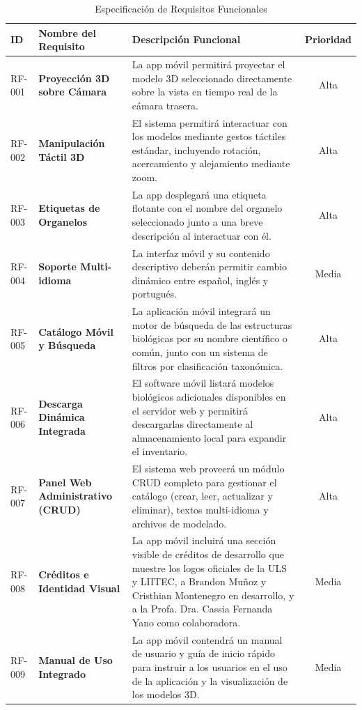\documentclass[11pt,a4paper]{article}
\begin{document}
\begin{table}[H]
    \centering
    \small
    \caption{Especificación de Requisitos Funcionales}
    \vspace{2mm}
    \renewcommand{\arraystretch}{1.3}
    \begin{tabularx}{\textwidth}{l >{\bfseries}l X c}
        \rowcolor{primaryDark}
        \color{white}\textbf{ID} & \color{white}\textbf{Nombre del Requisito} & \color{white}\textbf{Descripción Funcional} & \color{white}\textbf{Prioridad} \\ \toprule
        RF-001 & Proyección 3D sobre Cámara & La app móvil permitirá proyectar el modelo 3D seleccionado directamente sobre la vista en tiempo real de la cámara trasera. & Alta \\
        RF-002 & Manipulación Táctil 3D & El sistema permitirá interactuar con los modelos mediante gestos táctiles estándar, incluyendo rotación, acercamiento y alejamiento mediante zoom. & Alta \\ 
        RF-003 & Etiquetas de Organelos & La app desplegará una etiqueta flotante con el nombre del organelo seleccionado junto a una breve descripción al interactuar con él. & Alta \\
        RF-004 & Soporte Multi-idioma & La interfaz móvil y su contenido descriptivo deberán permitir cambio dinámico entre español, inglés y portugués. & Media \\
        RF-005 & Catálogo Móvil y Búsqueda & La aplicación móvil integrará un motor de búsqueda de las estructuras biológicas por su nombre científico o común, junto con un sistema de filtros por clasificación taxonómica. & Alta \\
        RF-006 & Descarga Dinámica Integrada & El software móvil listará modelos biológicos adicionales disponibles en el servidor web y permitirá descargarlas directamente al almacenamiento local para expandir el inventario. & Alta \\
        RF-007 & Panel Web Administrativo (CRUD) & El sistema web proveerá un módulo CRUD completo para gestionar el catálogo (crear, leer, actualizar y eliminar), textos multi-idioma y archivos de modelado. & Alta \\
        RF-008 & Créditos e Identidad Visual & La app móvil incluirá una sección visible de créditos de desarrollo que muestre los logos oficiales de la ULS y LIITEC, a Brandon Muñoz y Cristhian Montenegro en desarrollo, y a la Profa. Dra. Cassia Fernanda Yano como colaboradora. & Media \\
        RF-009 & Manual de Uso Integrado & La app móvil contendrá un manual de usuario y guía de inicio rápido para instruir a los usuarios en el uso de la aplicación y la visualización de los modelos 3D. & Media \\ \bottomrule
    \end{tabularx}
\end{table}
\end{document}
